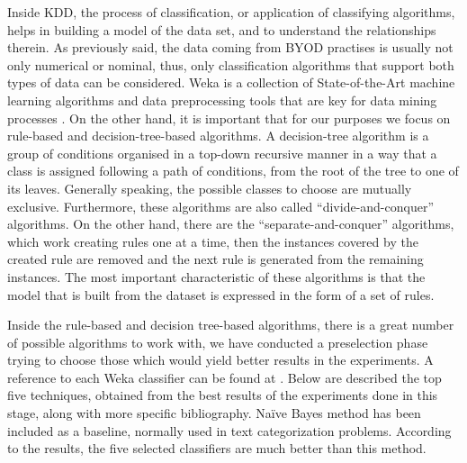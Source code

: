 Inside KDD, the process of classification, or application of classifying algorithms, helps in building a model of the data set, and to understand the relationships therein. As previously said, the data coming from BYOD practises is usually not only numerical or nominal, thus, only classification algorithms that support both types of data can be considered. Weka \cite{weka:site} is a collection of State-of-the-Art machine learning algorithms and data preprocessing tools that are key for data mining processes \cite{witten2016data}. On the other hand, it is important that for our purposes we focus on rule-based and decision-tree-based algorithms. A decision-tree algorithm is a group of conditions organised in a top-down recursive manner in a way that a class is assigned following a path of conditions, from the root of the tree to one of its leaves. Generally speaking, the possible classes to choose are mutually exclusive. Furthermore, these algorithms are also called ``divide-and-conquer'' algorithms. On the other hand, there are the ``separate-and-conquer'' algorithms, which work creating rules one at a time, then the instances covered by the created rule are removed and the next rule is generated from the remaining instances. The most important characteristic of these algorithms is that the model that is built from the dataset is expressed in the form of a set of rules.

Inside the rule-based and decision tree-based algorithms, there is a great number of possible algorithms to work with, we have conducted a preselection phase trying to choose those which would yield better results in the experiments. A reference to each Weka classifier can be found at \cite{witten2016data}. Below are described the top five techniques, obtained from the best results  of the experiments done in this stage, along with more specific bibliography. Na\"{i}ve Bayes method \cite{Bayesian_Classifier_97} has been included as a baseline, normally used in text categorization problems. According to the results, the five selected classifiers are much better than this method.

